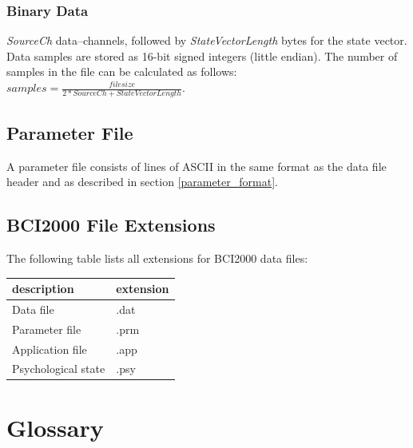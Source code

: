 \documentclass[letterpaper,oneside,12pt]{book}
\begin{document}
\subsubsection{Binary Data}
\label{binary_data}

\textit{SourceCh} data--channels, followed by \textit{StateVectorLength} bytes 
for the state vector. Data samples are stored as 16-bit signed integers (little 
endian). The number of samples in the file can be calculated as follows: 
$samples=\frac{filesize}{2*SourceCh+StateVectorLength}$.

\subsection{Parameter File}

A parameter file consists of lines of ASCII in the same format as the data file 
header and as described in section \ref{parameter_format}.

\newpage
\subsection{BCI2000 File Extensions}

The following table lists all extensions for BCI2000 data files:
\vspace{0.5cm}\\
\begin{centering}
 \centering
 \begin{tabular}{|l|l|}
  \hline
  \textbf{description} & \textbf{extension} \\
  \hline
  Data file & .dat \\
  \hline
  Parameter file & .prm \\
  \hline
  Application file & .app \\
  \hline
  Psychological state & .psy \\
  \hline
 \end{tabular}
\end{centering}   

\section{Glossary} 
\end{document}
